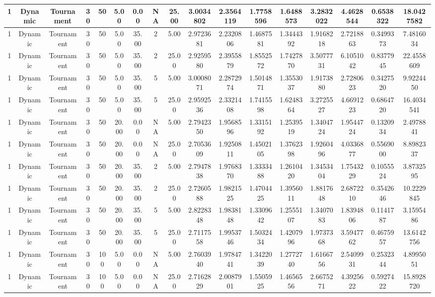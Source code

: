 \begin{longtable}{ | c | c | c | c | c | c | c | c | c | c | c | c | c | c | c | c | c | }
	\hline
	1	&	Dynamic	&	Tournament	&	30	&	50	&	5.00	&	0.00	&	NA	&	25.00	&	3.0034802	&	2.3564119	&	1.7758596	&	1.6488573	&	3.2832022	&	4.4628544	&	0.6538322	&	18.0427582 \\
	\hline
	1	&	Dynamic	&	Tournament	&	30	&	50	&	5.00	&	35.00	&	2	&	5.00	&	2.9723681	&	2.2320806	&	1.4687581	&	1.3444392	&	1.9168218	&	2.7218863	&	0.3499373	&	7.4816034 \\
	\hline
	1	&	Dynamic	&	Tournament	&	30	&	50	&	5.00	&	35.00	&	2	&	25.00	&	2.9259580	&	2.3955879	&	1.8552572	&	1.7427870	&	3.5077731	&	6.1051042	&	0.8377945	&	22.4558609 \\
	\hline
	1	&	Dynamic	&	Tournament	&	30	&	50	&	5.00	&	35.00	&	5	&	5.00	&	3.0008071	&	2.2872974	&	1.5014871	&	1.3553037	&	1.9173880	&	2.7280623	&	0.3427520	&	9.9224450 \\
	\hline
	1	&	Dynamic	&	Tournament	&	30	&	50	&	5.00	&	35.00	&	5	&	25.00	&	2.9592536	&	2.3321408	&	1.7415598	&	1.6248364	&	3.2725527	&	4.6691223	&	0.6864720	&	16.4034541 \\
	\hline
	1	&	Dynamic	&	Tournament	&	30	&	50	&	20.00	&	0.00	&	NA	&	5.00	&	2.7942350	&	1.9568596	&	1.3315192	&	1.2539519	&	1.3404724	&	1.9544724	&	0.1320934	&	2.4978841 \\
	\hline
	1	&	Dynamic	&	Tournament	&	30	&	50	&	20.00	&	0.00	&	NA	&	25.00	&	2.7053609	&	1.9250811	&	1.4502105	&	1.3762398	&	1.9260496	&	4.0336877	&	0.5569000	&	8.8982337 \\
	\hline
	1	&	Dynamic	&	Tournament	&	30	&	50	&	20.00	&	35.00	&	2	&	5.00	&	2.7947838	&	1.9768370	&	1.3333488	&	1.2610420	&	1.3453404	&	1.7543229	&	0.1055524	&	3.8732595 \\
	\hline
	1	&	Dynamic	&	Tournament	&	30	&	50	&	20.00	&	35.00	&	2	&	25.00	&	2.7260588	&	1.9821525	&	1.4704425	&	1.3956011	&	1.8817648	&	2.6872210	&	0.3542646	&	10.2229845 \\
	\hline
	1	&	Dynamic	&	Tournament	&	30	&	50	&	20.00	&	35.00	&	5	&	5.00	&	2.8228348	&	1.9838148	&	1.3309642	&	1.2555107	&	1.3407083	&	1.8394806	&	0.1141787	&	3.1595486 \\
	\hline
	1	&	Dynamic	&	Tournament	&	30	&	50	&	20.00	&	35.00	&	5	&	25.00	&	2.7117558	&	1.9953746	&	1.5032434	&	1.4207996	&	1.9737368	&	3.5947762	&	0.4675957	&	13.6142756 \\
	\hline
	1	&	Dynamic	&	Tournament	&	30	&	100	&	5.00	&	0.00	&	NA	&	5.00	&	2.7603940	&	1.9784741	&	1.3422039	&	1.2772740	&	1.6166756	&	2.5409931	&	0.2532344	&	4.8995051 \\
	\hline
	1	&	Dynamic	&	Tournament	&	30	&	100	&	5.00	&	0.00	&	NA	&	25.00	&	2.7162829	&	2.0087901	&	1.5505925	&	1.4656556	&	2.6675271	&	4.3925622	&	0.5927422	&	15.8928720 \\

\end{longtable}
